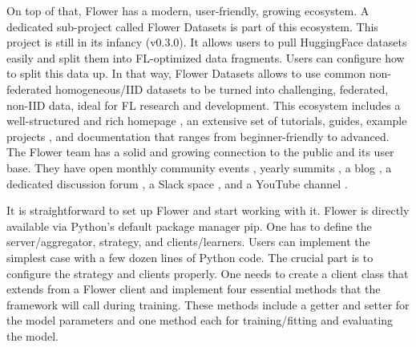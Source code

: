 On top of that, Flower has a modern, user-friendly, growing ecosystem.
A dedicated sub-project called Flower Datasets \cite{flower:datasets} is part of this ecosystem.
This project is still in its infancy (v0.3.0).
It allows users to pull HuggingFace \cite{hugging_face_homepage} datasets easily and split them into FL-optimized data fragments.
Users can configure how to split this data up.
In that way, Flower Datasets allows to use common non-federated homogeneous/IID datasets
to be turned into challenging, federated, non-IID data, ideal for FL research and development.
This ecosystem includes a well-structured and rich homepage \cite{flower:homepage}, an extensive set of tutorials, guides,
example projects \cite{flower:examples}, and documentation \cite{flower:homepage_docs, flower_docs} that ranges from beginner-friendly to advanced.
The Flower team has a solid and growing connection to the public and its user base.
They have open monthly community events \cite{flower:monthly}, yearly summits \cite{flower:summit}, a blog \cite{flower:blog}, a dedicated discussion forum \cite{flower:forum},
a Slack space \cite{flower:slack}, and a YouTube channel \cite{flower:youtube}.

It is straightforward to set up Flower and start working with it.
Flower is directly available via Python's default package manager pip.
One has to define the server/aggregator, strategy, and clients/learners.
Users can implement the simplest case with a few dozen lines of Python code.
The crucial part is to configure the strategy and clients properly.
One needs to create a client class that extends from a Flower client and implement four essential methods
that the framework will call during training.
These methods include a getter and setter for the model parameters and one method each for 
training/fitting and evaluating the model.